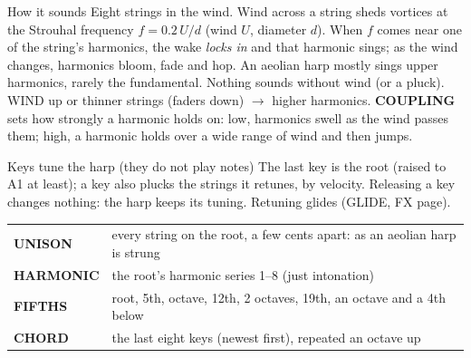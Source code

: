 \documentclass{article}
\newcommand{\WN}[1]{\textcolor{wndc}{#1}}
\newcommand{\ST}[1]{\textcolor{strc}{#1}}
\begin{document}
\vspace{1.2mm}
\begin{minipage}[t]{80mm}\vspace{0pt}
\begin{card}{How it sounds}
Eight strings in the wind. Wind across a string sheds vortices at the Strouhal frequency
\(f = 0.2\,U/d\) (wind \(U\), diameter \(d\)). When \(f\) comes near one of the string's harmonics, the wake
\emph{locks in} and that harmonic sings; as the wind changes, harmonics bloom, fade and hop. An aeolian harp
mostly sings upper harmonics, rarely the fundamental. Nothing sounds without wind (or a pluck).\\[0.4mm]
\WN{WIND} up or thinner strings (faders down) \(\to\) higher harmonics. \textbf{COUPLING} sets how
strongly a harmonic holds on: low, harmonics swell as the wind passes them; high, a harmonic holds over a
wide range of wind and then jumps.
\end{card}
\begin{card}{Keys tune the harp (they do not play notes)}
\fontsize{6.8}{8.1}\selectfont
The last key is the root (raised to A1 at least); a key also plucks the strings it retunes, by velocity.
Releasing a key changes nothing: the harp keeps its tuning. Retuning glides (GLIDE, FX page).
\begin{tabularx}{\linewidth}{@{}l L@{}}
\ST{\textbf{UNISON}} & every string on the root, a few cents apart: as an aeolian harp is strung \\
\ST{\textbf{HARMONIC}} & the root's harmonic series 1--8 (just intonation) \\
\ST{\textbf{FIFTHS}} & root, 5th, octave, 12th, 2 octaves, 19th, an octave and a 4th below \\
\ST{\textbf{CHORD}} & the last eight keys (newest first), repeated an octave up \\
\end{tabularx}
\end{card}
\end{minipage}\hfill
\end{document}
